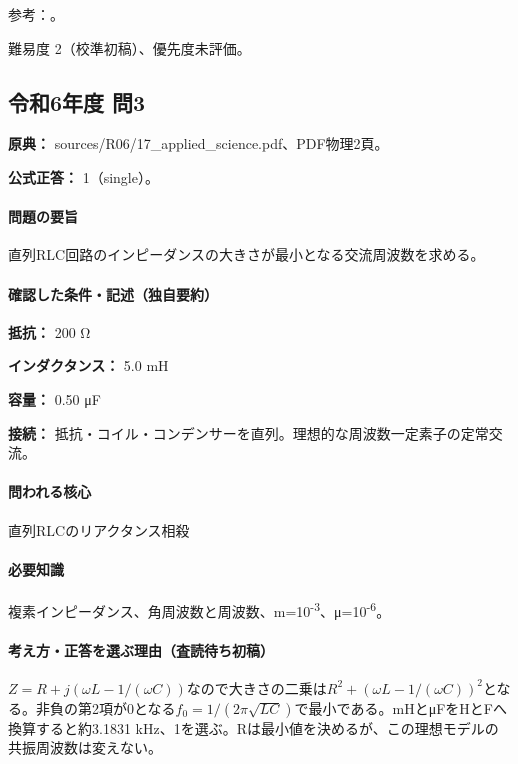 \par 参考：\cite{mit_em11}。

\par 難易度 2（校準初稿）、優先度未評価。

\subsection{令和6年度 問3}
\label{q:r06-reg-applied-03}

\noindent\textbf{原典：} sources/R06/17\_applied\_science.pdf、PDF物理2頁。

\textbf{公式正答：} 1（single）。

\paragraph{問題の要旨} 直列RLC回路のインピーダンスの大きさが最小となる交流周波数を求める。

\paragraph{確認した条件・記述（独自要約）}\mbox{}\par

\noindent\textbf{抵抗：} 200 Ω\par

\noindent\textbf{インダクタンス：} 5.0 mH\par

\noindent\textbf{容量：} 0.50 μF\par

\noindent\textbf{接続：} 抵抗・コイル・コンデンサーを直列。理想的な周波数一定素子の定常交流。\par

\paragraph{問われる核心} 直列RLCのリアクタンス相殺

\paragraph{必要知識} 複素インピーダンス、角周波数と周波数、m=\allowbreak{}10\textsuperscript{-3}、μ=10\textsuperscript{-6}。

\paragraph{考え方・正答を選ぶ理由（査読待ち初稿）} \(Z=R+j(\omega L-1/(\omega C))\)なので大きさの二乗は\(R^2+(\omega L-1/(\omega C))^2\)となる。非負の第2項が0となる\(f_0=1/(2\pi\sqrt{LC})\)で最小である。mHとμFをHとFへ換算すると約3.1831 kHz、1を選ぶ。Rは最小値を決めるが、この理想モデルの共振周波数は変えない。


